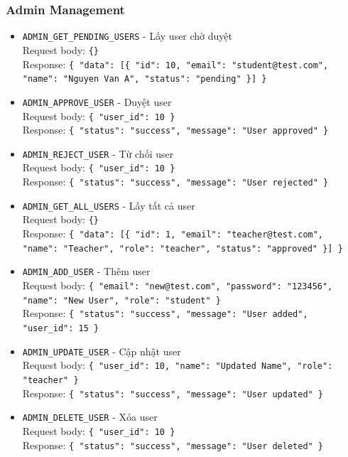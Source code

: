 \documentclass[12pt,a4paper]{report}
\newcommand{\json}[1]{\texttt{\allowbreak#1\allowbreak}}
\begin{document}
\subsubsection{Admin Management}
\begin{itemize}
    \item \texttt{ADMIN\_GET\_PENDING\_USERS} - Lấy user chờ duyệt \\
    Request body: \json{\{\}} \\
    Response: \json{\{ "data": [\{ "id": 10, "email": "student@test.com", "name": "Nguyen Van A", "status": "pending" \}] \}}
    \item \texttt{ADMIN\_APPROVE\_USER} - Duyệt user \\
    Request body: \json{\{ "user\_id": 10 \}} \\
    Response: \json{\{ "status": "success", "message": "User approved" \}}
    \item \texttt{ADMIN\_REJECT\_USER} - Từ chối user \\
    Request body: \json{\{ "user\_id": 10 \}} \\
    Response: \json{\{ "status": "success", "message": "User rejected" \}}
    \item \texttt{ADMIN\_GET\_ALL\_USERS} - Lấy tất cả user \\
    Request body: \json{\{\}} \\
    Response: \json{\{ "data": [\{ "id": 1, "email": "teacher@test.com", "name": "Teacher", "role": "teacher", "status": "approved" \}] \}}
    \item \texttt{ADMIN\_ADD\_USER} - Thêm user \\
    Request body: \json{\{ "email": "new@test.com", "password": "123456", "name": "New User", "role": "student" \}} \\
    Response: \json{\{ "status": "success", "message": "User added", "user\_id": 15 \}}
    \item \texttt{ADMIN\_UPDATE\_USER} - Cập nhật user \\
    Request body: \json{\{ "user\_id": 10, "name": "Updated Name", "role": "teacher" \}} \\
    Response: \json{\{ "status": "success", "message": "User updated" \}}
    \item \texttt{ADMIN\_DELETE\_USER} - Xóa user \\
    Request body: \json{\{ "user\_id": 10 \}} \\
    Response: \json{\{ "status": "success", "message": "User deleted" \}}
\end{itemize}
\end{document}
